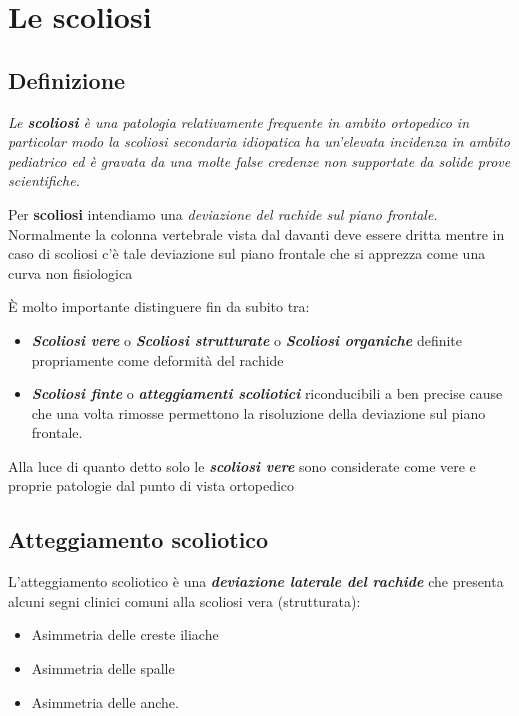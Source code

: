

\section{Le scoliosi}

\subsection{Definizione }


\emph{Le \textbf{scoliosi} è una patologia relativamente frequente in
ambito ortopedico in particolar modo la scoliosi secondaria idiopatica
ha un'elevata incidenza in ambito pediatrico ed è gravata da una molte
false credenze non supportate da solide prove scientifiche.}

Per \textbf{scoliosi} intendiamo una \emph{deviazione del rachide sul
piano frontale.} Normalmente la colonna vertebrale vista dal davanti
deve essere dritta mentre in caso di scoliosi c'è tale deviazione sul
piano frontale che si apprezza come una curva non fisiologica

È molto importante distinguere fin da subito tra:

\begin{itemize}
\item
  \textbf{\emph{Scoliosi vere}} o \textbf{\emph{Scoliosi strutturate}} o
  \textbf{\emph{Scoliosi organiche}} definite propriamente come
  deformità del rachide
\item
  \textbf{\emph{Scoliosi finte}} o \textbf{\emph{atteggiamenti
  scoliotici}} riconducibili a ben precise cause che una volta rimosse
  permettono la risoluzione della deviazione sul piano frontale.
\end{itemize}

Alla luce di quanto detto solo le \textbf{\emph{scoliosi vere}} sono
considerate come vere e proprie patologie dal punto di vista ortopedico

\subsection{Atteggiamento scoliotico}


L'atteggiamento scoliotico è una \textbf{\emph{deviazione laterale del
rachide}} che presenta alcuni segni clinici comuni alla scoliosi vera
(strutturata):

\begin{itemize}
\item
  Asimmetria delle creste iliache
\item
  Asimmetria delle spalle
\item
  Asimmetria delle anche.
\end{itemize}

